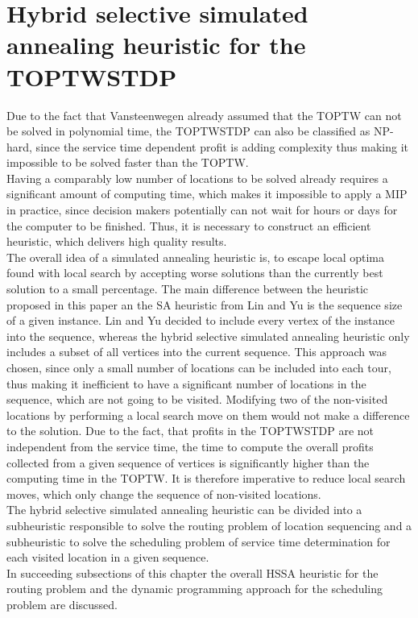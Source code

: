 \documentclass[final,5p,times,twocolumn]{elsarticle}
\begin{document}
\section{Hybrid selective simulated annealing heuristic for the TOPTWSTDP}
Due to the fact that Vansteenwegen \cite{Vansteenwegen:2009ils} already assumed that the TOPTW can not be solved in polynomial time, the TOPTWSTDP can also be classified as NP-hard, since the service time dependent profit is adding complexity thus making it impossible to be solved faster than the TOPTW. \\
Having a comparably low number of locations to be solved already requires a significant amount of computing time, which makes it impossible to apply a MIP in practice, since decision makers potentially can not wait for hours or days for the computer to be finished. Thus, it is necessary to construct an efficient heuristic, which delivers high quality results.\\
The overall idea of a simulated annealing heuristic is, to escape local optima found with local search by accepting worse solutions than the currently best solution to a small percentage.  The main difference between the heuristic proposed in this paper an the SA heuristic from Lin and Yu \cite{Lin:2012sa} is the sequence size of a given instance. Lin and Yu decided to include every vertex of the instance into the sequence, whereas the hybrid selective simulated annealing heuristic only includes a subset of all vertices into the current sequence. This approach was chosen, since only a small number of locations can be included into each tour, thus making it inefficient to have a significant number of locations in the sequence, which are not going to be visited. Modifying two of the non-visited locations by performing a local search move on them would not make a difference to the solution. Due to the fact, that profits in the TOPTWSTDP are not independent from the service time, the time to compute the overall profits collected from a given sequence of vertices is significantly higher than the computing time in the TOPTW. It is therefore imperative to reduce local search moves, which only change the sequence of non-visited locations. \\
The hybrid selective simulated annealing heuristic can be divided into a subheuristic responsible to solve the routing problem of location sequencing and a subheuristic to solve the scheduling problem of service time determination for each visited location in a given sequence.\\
In succeeding subsections of this chapter the overall HSSA heuristic for the routing problem and the dynamic programming approach for the scheduling problem are discussed.
\end{document}
